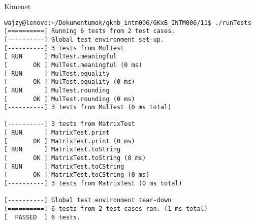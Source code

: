 \begin{frame}
  \begin{exampleblock}{}
    \scriptsize
    
  \end{exampleblock}
\end{frame}

\begin{frame}[fragile]
  \begin{block}{Kimenet}
    \tiny
    \begin{verbatim}
wajzy@lenovo:~/Dokumentumok/gknb_intm006/GKxB_INTM006/11$ ./runTests 
[==========] Running 6 tests from 2 test cases.
[----------] Global test environment set-up.
[----------] 3 tests from MulTest
[ RUN      ] MulTest.meaningful
[       OK ] MulTest.meaningful (0 ms)
[ RUN      ] MulTest.equality
[       OK ] MulTest.equality (0 ms)
[ RUN      ] MulTest.rounding
[       OK ] MulTest.rounding (0 ms)
[----------] 3 tests from MulTest (0 ms total)

[----------] 3 tests from MatrixTest
[ RUN      ] MatrixTest.print
[       OK ] MatrixTest.print (0 ms)
[ RUN      ] MatrixTest.toString
[       OK ] MatrixTest.toString (0 ms)
[ RUN      ] MatrixTest.toCString
[       OK ] MatrixTest.toCString (0 ms)
[----------] 3 tests from MatrixTest (0 ms total)

[----------] Global test environment tear-down
[==========] 6 tests from 2 test cases ran. (1 ms total)
[  PASSED  ] 6 tests.\end{verbatim}
  \end{block}
\end{frame}
